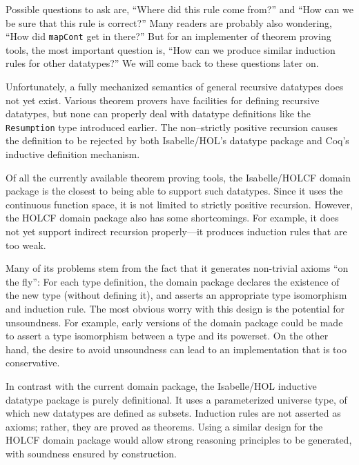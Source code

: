 \documentclass{llncs}
\begin{document}
Possible questions to ask are, ``Where did this rule come from?'' and
``How can we be sure that this rule is correct?''  Many readers are
probably also wondering, ``How did \texttt{mapCont} get in there?''
But for an implementer of theorem proving tools, the most important
question is, ``How can we produce similar induction rules for other
datatypes?''  We will come back to these questions later on.

Unfortunately, a fully mechanized semantics of general recursive
datatypes does not yet exist.  Various theorem provers have facilities
for defining recursive datatypes, but none can properly deal with
datatype definitions like the \texttt{Resumption} type introduced
earlier.  The non--strictly positive recursion causes the definition
to be rejected by both Isabelle/HOL's datatype package and Coq's
inductive definition mechanism.

Of all the currently available theorem proving tools, the
Isabelle/HOLCF domain package is the closest to being able to support
such datatypes.  Since it uses the continuous function space, it is
not limited to strictly positive recursion.  However, the HOLCF domain
package also has some shortcomings.  For example, it does not yet
support indirect recursion properly---it produces induction rules that
are too weak.

Many of its problems stem from the fact that it generates non-trivial
axioms ``on the fly'': For each type definition, the domain package
declares the existence of the new type (without defining it), and
asserts an appropriate type isomorphism and induction rule.  The most
obvious worry with this design is the potential for unsoundness.  For
example, early versions of the domain package could be made to assert
a type isomorphism between a type and its powerset.  On the other
hand, the desire to avoid unsoundness can lead to an implementation
that is too conservative.

In contrast with the current domain package, the Isabelle/HOL
inductive datatype package \cite{paulson97mechanizing} is purely
definitional.  It uses a parameterized universe type, of which new
datatypes are defined as subsets.  Induction rules are not asserted as
axioms; rather, they are proved as theorems.  Using a similar design
for the HOLCF domain package would allow strong reasoning principles
to be generated, with soundness ensured by construction.
\end{document}
